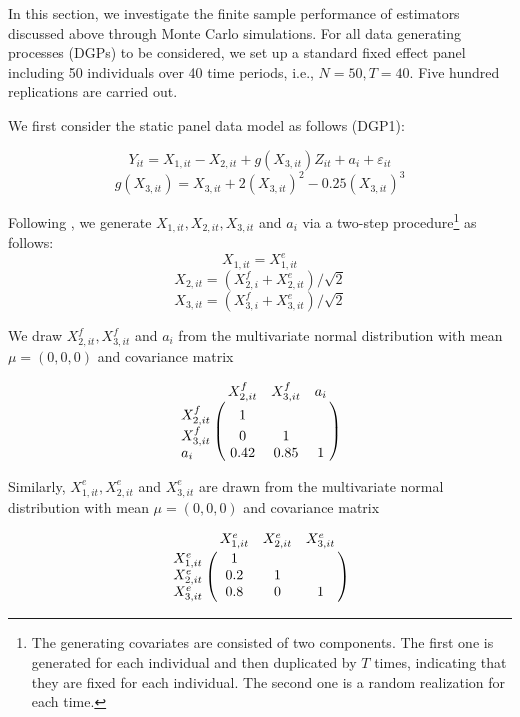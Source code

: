 In this section, we investigate the finite sample performance of estimators discussed above through Monte Carlo simulations. For all data generating processes (DGPs) to be considered, we set up a standard fixed effect panel including 50 individuals over 40 time periods, i.e., $N=50,T=40$. Five hundred replications are carried out.

We first consider the static panel data model as follows (DGP1):

\begin{equation}
Y_{it}=X_{1,it}-X_{2,it}+g(X_{3,it})Z_{it} +a_{i}+\varepsilon_{it}
\end{equation}
\begin{equation}
 g(X_{3,it})=X_{3,it}+2(X_{3,it})^{2} -0.25 (X_{3,it})^{3}
\end{equation}

 Following \citet{libois2013semiparametric}, we generate $X_{1,it},X_{2,it},X_{3,it}$ and $a_{i}$ via a two-step procedure\footnote{The generating covariates are consisted of two components. The first one is generated for each individual and then duplicated by $T$ times, indicating that they are fixed for each individual. The second one is a random realization for each time.} as follows:
 \begin{equation}
 X_{1,it}=X_{1,it}^{e}
 \end{equation}
 \begin{equation}
  X_{2,it}=(X_{2,i}^{f}+X_{2,it}^{e})/\sqrt{2}
 \end{equation}
 \begin{equation}
  X_{3,it}=(X_{3,i}^{f}+X_{3,it}^{e})/\sqrt{2}
 \end{equation}

We draw $X_{2,it}^{f},X_{3,it}^{f}$ and $a_{i}$ from the multivariate normal distribution with mean $\mu=(0,0,0)$ and covariance matrix

\[
\bordermatrix{  & X_{2,it}^{f} & X_{3,it}^{f} & a_{i} \cr
			X_{2,it}^{f} & 1 &   &      \cr
			X_{3,it}^{f} & 0 & 1 &    \cr
			a_{i}    & 0.42 & 0.85 & 1 }
\]

Similarly, $X_{1,it}^{e},X_{2,it}^{e}$ and $X_{3,it}^{e}$ are drawn from  the multivariate normal distribution with mean $\mu=(0,0,0)$ and covariance matrix

\[
\bordermatrix{  & X_{1,it}^{e} & X_{2,it}^{e} & X_{3,it}^{e} \cr
	X_{1,it}^{e} & 1 &   &      \cr
	X_{2,it}^{e} & 0.2 & 1 &    \cr
	X_{3,it}^{e}   & 0.8 & 0 & 1 }
\]

